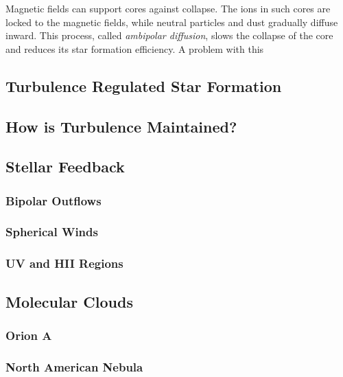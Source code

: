 Magnetic fields can support cores against collapse. The ions in such cores are locked to the magnetic fields, while neutral particles and dust gradually diffuse inward. This process, called \textit{ambipolar diffusion}, slows the collapse of the core and reduces its star formation efficiency. A problem with this  

\subsection{Turbulence Regulated Star Formation}\label{sec:turb}

\subsection{How is Turbulence Maintained?}\label{sec:turb-maint}

\subsection{Stellar Feedback}\label{sec:feedback}

\subsubsection{Bipolar Outflows}\label{sec:outflow}

\subsubsection{Spherical Winds}\label{sec:wind}

\subsubsection{UV and HII Regions}\label{sec:uv}

\subsection{Molecular Clouds}\label{sec:clouds}

\subsubsection{Orion A}\label{sec:orion}

\subsubsection{North American Nebula}\label{sec:nan}
  
  
  
  
  